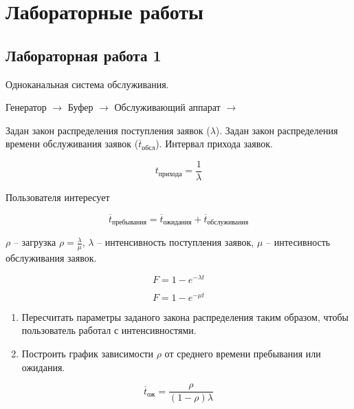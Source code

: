 \section{Лабораторные работы}

\subsection{Лабораторная работа 1}

Одноканальная система обслуживания.

Генератор $\rightarrow$ Буфер $\rightarrow$ Обслуживающий аппарат $\rightarrow$

Задан закон распределения поступления заявок ($\lambda$). Задан закон распределения времени обслуживания заявок ($\overline{t}_\text{обсл}$). Интервал прихода заявок.

\begin{equation*}
    t_\text{прихода} = \frac{1}{\lambda}
\end{equation*}

Пользователя интересует

\begin{equation*}
    \overline{t}_\text{пребывания} = \overline{t}_\text{ожидания} + \overline{t}_\text{обслуживания}
\end{equation*}

$\rho$ -- загрузка $\rho = \frac{\lambda}{\mu}$, $\lambda$ -- интенсивность поступления заявок, $\mu$ -- интесивность обслуживания заявок.

\begin{equation*}
    F = 1 - e^{-\lambda t}
\end{equation*}

\begin{equation*}
    F = 1 - e^{-\mu t}
\end{equation*}

\begin{enumerate}
    \item Пересчитать параметры заданого закона распределения таким образом, чтобы пользователь работал с интенсивностями.
    \item Построить график зависимости $\rho$ от среднего времени пребывания или ожидания.
\end{enumerate}

\begin{equation*}
    \overline{t}_\text{ож} = \frac{\rho}{(1 - \rho) \lambda}
\end{equation*}
